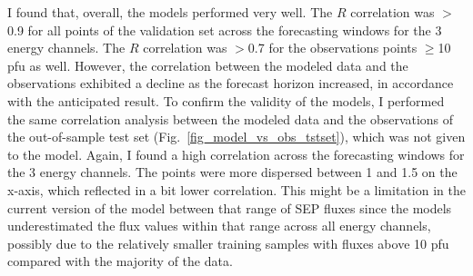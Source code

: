 I found that, overall, the models performed very well. The $R$ correlation was $>$0.9 for all points of the validation set across the forecasting windows for the 3 energy channels. The $R$ correlation was $>$0.7 for the observations points $\geq$10 pfu as well. However, the correlation between the modeled data and the observations exhibited a decline as the forecast horizon increased, in accordance with the anticipated result.
To confirm the validity of the models, I performed the same correlation analysis between the modeled data and the observations of the out-of-sample test set (Fig.~\ref{fig_model_vs_obs_tstset}), which was not given to the model. Again, I found a high correlation across the forecasting windows for the 3 energy channels. 
The points were more dispersed between 1 and 1.5 on the x-axis, which reflected in a bit lower correlation. This might be a limitation in the current version of the model between that range of SEP fluxes since the models underestimated the flux values within that range across all energy channels, possibly due to the relatively smaller training samples with fluxes above 10 pfu compared with the majority of the data.

